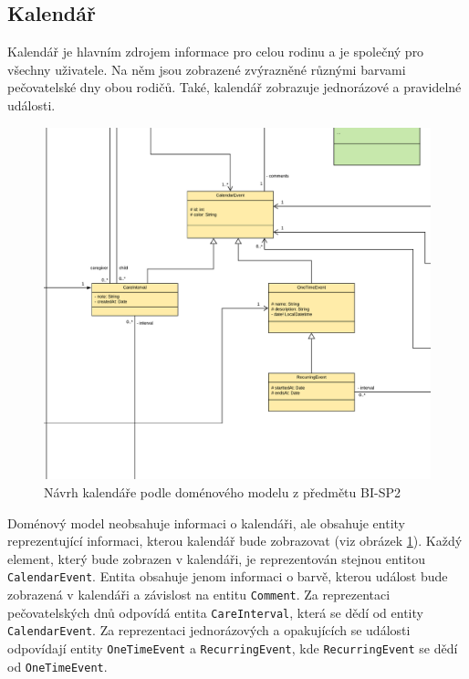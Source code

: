     \subsection{Kalendář}    
        Kalendář je hlavním zdrojem informace pro celou rodinu a je společný pro všechny uživatele. Na něm jsou zobrazené zvýrazněné různými barvami pečovatelské dny obou rodičů. Také, kalendář zobrazuje jednorázové a pravidelné události.
        
        \begin{figure}\centering
	        \includegraphics[width=1.0\textwidth]{pdfs/CalendarInfo1}
	        \caption[Současný návrh kalendáře]{Návrh kalendáře podle doménového modelu z předmětu BI-SP2}\label{image:calendar-info}
        \end{figure}
        Doménový model neobsahuje informaci o kalendáři, ale obsahuje entity reprezentující informaci, kterou kalendář bude zobrazovat (viz obrázek \ref{image:calendar-info}). Každý element, který bude zobrazen v kalendáři, je reprezentován stejnou entitou \verb|CalendarEvent|. Entita obsahuje jenom informaci o barvě, kterou událost bude zobrazená v kalendáři a závislost na entitu \verb|Comment|. Za reprezentaci pečovatelských dnů odpovídá entita \verb|CareInterval|, která se dědí od entity \verb|CalendarEvent|. Za reprezentaci jednorázových a opakujících se události odpovídají entity \verb|OneTimeEvent| a \verb|RecurringEvent|, kde \verb|RecurringEvent| se dědí od \verb|OneTimeEvent|.
        
